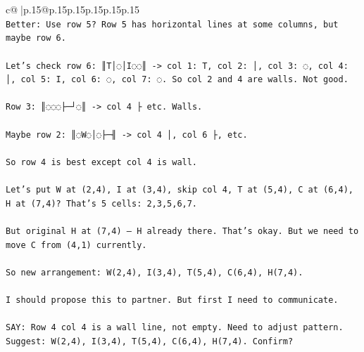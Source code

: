 \documentclass{article}
\begin{document}
{\begin{supertabular}{c@{$\;$}|p{.15\linewidth}@{}p{.15\linewidth}p{.15\linewidth}p{.15\linewidth}p{.15\linewidth}p{.15\linewidth}}
{{{\\ 
\texttt{Better: Use row 5? Row 5 has horizontal lines at some columns, but maybe row 6.} \\
\\ 
\texttt{Let’s check row 6: ║T│◌│I◌◌║  {-}> col 1: T, col 2: │, col 3: ◌, col 4: │, col 5: I, col 6: ◌, col 7: ◌. So col 2 and 4 are walls. Not good.} \\
\\ 
\texttt{Row 3: ║◌◌◌├─┘◌║  {-}> col 4 ├ etc. Walls.} \\
\\ 
\texttt{Maybe row 2: ║◌W◌│◌├─╢ {-}> col 4 │, col 6 ├, etc.} \\
\\ 
\texttt{So row 4 is best except col 4 is wall.} \\
\\ 
\texttt{Let’s put W at (2,4), I at (3,4), skip col 4, T at (5,4), C at (6,4), H at (7,4)? That's 5 cells: 2,3,5,6,7.} \\
\\ 
\texttt{But original H at (7,4) — H already there. That's okay. But we need to move C from (4,1) currently.} \\
\\ 
\texttt{So new arrangement: W(2,4), I(3,4), T(5,4), C(6,4), H(7,4).} \\
\\ 
\texttt{I should propose this to partner. But first I need to communicate.} \\
\\ 
\texttt{SAY: Row 4 col 4 is a wall line, not empty. Need to adjust pattern. Suggest: W(2,4), I(3,4), T(5,4), C(6,4), H(7,4). Confirm?} \\
            }
        }
    }
     \\ \\


\end{supertabular}}
\end{document}
